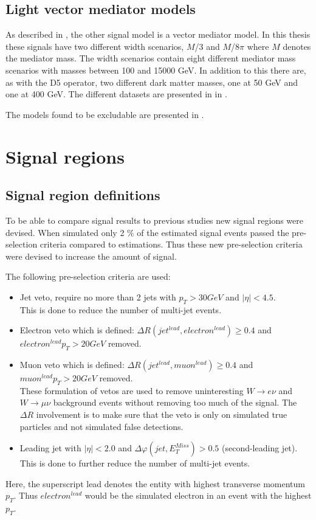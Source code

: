 \subsection{Light vector mediator models}\label{sec:signal:subsec:vecmed}
As described in , the other signal model is a vector mediator model. In this thesis these signals have two different width scenarios, $M$/3 and $M$/8$\pi$ where $M$ denotes the mediator mass. The width scenarios contain eight different mediator mass scenarios with masses between 100 and 15000 GeV. In addition to this there are, as with the D5 operator, two different dark matter masses, one at 50 GeV and one at 400 GeV. The different datasets are presented in  in .

The models found to be excludable are presented in . 
\newpage
\section{Signal regions}
\subsection{Signal region definitions}\label{sec:sr:subsec:srd}
To be able to compare signal results to previous studies new signal regions were devised. When simulated only 2 \% of the estimated signal events passed the pre-selection criteria compared to estimations. Thus these new pre-selection criteria were devised to increase the amount of signal. 

The following pre-selection criteria are used:
\begin{itemize}
\item Jet veto, require no more than 2 jets with $p_T > 30 GeV$ and $|\eta| < 4.5$.  \\ 
This is done to reduce the number of multi-jet events.
\item Electron veto which is defined: $\Delta R (jet^{lead},electron^{lead})\geq 0.4$ and \\
$electron^{lead} p_T>20 GeV$ removed.
\item Muon veto which is defined: $\Delta R (jet^{lead},muon^{lead})\geq 0.4$ and \\
$muon^{lead} p_T>20 GeV$ removed. \\
These formulation of vetos are used to remove uninteresting $W \rightarrow e \nu$ and $W \rightarrow \mu \nu$ background events without removing too much of the signal. The $\Delta R$ involvement is to make sure that the veto is only on simulated true particles and not simulated false detections.
\item Leading jet with $|\eta| < 2.0$ and $\Delta \varphi (jet, E_T^{Miss})>0.5$ (second-leading jet).\\ 
This is done to further reduce the number of multi-jet events.
\end{itemize}
Here, the superscript lead denotes the entity with highest transverse momentum $p_T$. Thus $electron^{lead}$ would be the simulated electron in an event with the highest $p_T$.

